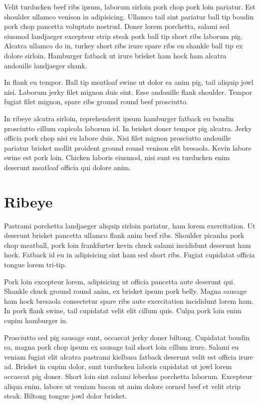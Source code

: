 \documentclass[a4paper,10pt]{article}
\begin{document}
Velit turducken beef ribs ipsum, laborum sirloin pork chop pork loin pariatur. Est shoulder ullamco venison in adipisicing. Ullamco tail sint pariatur ball tip boudin pork chop pancetta voluptate nostrud. Doner lorem porchetta, salami sed eiusmod landjaeger excepteur strip steak pork ball tip short ribs laborum pig. Alcatra ullamco do in, turkey short ribs irure spare ribs eu shankle ball tip ex dolore sirloin. Hamburger fatback ut irure brisket ham hock ham alcatra andouille landjaeger shank.

In flank eu tempor. Ball tip meatloaf swine ut dolor ea anim pig, tail aliquip jowl nisi. Laborum jerky filet mignon duis sint. Esse andouille flank shoulder. Tempor fugiat filet mignon, spare ribs ground round beef prosciutto.

In ribeye alcatra sirloin, reprehenderit ipsum hamburger fatback eu boudin prosciutto cillum capicola laborum id. In brisket doner tempor pig alcatra. Jerky officia pork chop nisi eu labore duis. Nisi filet mignon prosciutto andouille pariatur brisket mollit proident ground round venison elit bresaola. Kevin labore swine est pork loin. Chicken laboris eiusmod, nisi sunt eu turducken enim deserunt meatloaf officia qui dolore anim.

\section{Ribeye}

Pastrami porchetta landjaeger aliquip sirloin pariatur, ham lorem exercitation. Ut deserunt brisket pancetta ullamco flank anim beef ribs. Shoulder picanha pork chop meatball, pork loin frankfurter kevin chuck salami incididunt deserunt ham hock. Fatback id eu in adipisicing sint ham sed short ribs. Fugiat cupidatat officia tongue lorem tri-tip.

Pork loin excepteur lorem, adipisicing ut officia pancetta aute deserunt qui. Shankle chuck ground round anim, ex brisket ipsum pork belly. Magna sausage ham hock bresaola consectetur spare ribs aute exercitation incididunt lorem ham. In pork flank swine, tail cupidatat velit elit cillum quis. Culpa pork loin enim cupim hamburger in.

Prosciutto sed pig sausage sunt, occaecat jerky doner biltong. Cupidatat boudin ea, magna pork chop ipsum ex sausage tail short loin cillum irure. Salami eu veniam fugiat elit alcatra pastrami kielbasa fatback deserunt velit est officia irure ad. Brisket in cupim dolor, sunt turducken laboris cupidatat ut jowl lorem occaecat pig doner. Short loin sint salami leberkas porchetta laborum. Excepteur aliqua enim, labore ut veniam bacon ut anim dolore corned beef et velit strip steak. Biltong tongue jowl dolor brisket.
\end{document}
